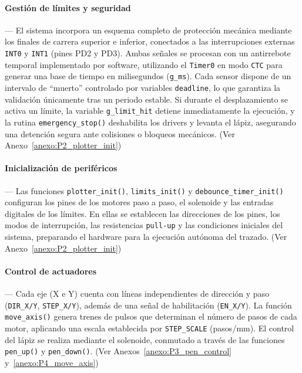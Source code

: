 \vspace{1em}

\paragraph*{\textbf{Gestión de límites y seguridad}}---
El sistema incorpora un esquema completo de protección mecánica mediante los finales de carrera superior e inferior, conectados a las interrupciones externas \texttt{INT0} y \texttt{INT1} (pines PD2 y PD3). Ambas señales se procesan con un antirrebote temporal implementado por software, utilizando el \texttt{Timer0} en modo \texttt{CTC} para generar una base de tiempo en milisegundos (\texttt{g\_ms}). Cada sensor dispone de un intervalo de “muerto” controlado por variables \texttt{deadline}, lo que garantiza la validación únicamente tras un periodo estable. Si durante el desplazamiento se activa un límite, la variable \texttt{g\_limit\_hit} detiene inmediatamente la ejecución, y la rutina \texttt{emergency\_stop()} deshabilita los drivers y levanta el lápiz, asegurando una detención segura ante colisiones o bloqueos mecánicos. (Ver Anexo~\ref{anexo:P2_plotter_init})

\vspace{1em}

\paragraph*{\textbf{Inicialización de periféricos}}---
Las funciones \texttt{plotter\_init()}, \texttt{limits\_init()} y \texttt{debounce\_timer\_init()} configuran los pines de los motores paso a paso, el solenoide y las entradas digitales de los límites. En ellas se establecen las direcciones de los pines, los modos de interrupción, las resistencias \texttt{pull-up} y las condiciones iniciales del sistema, preparando el hardware para la ejecución autónoma del trazado. (Ver Anexo~\ref{anexo:P2_plotter_init})

\vspace{1em}

\paragraph*{\textbf{Control de actuadores}}---
Cada eje (X e Y) cuenta con líneas independientes de dirección y paso (\texttt{DIR\_X/Y}, \texttt{STEP\_X/Y}), además de una señal de habilitación (\texttt{EN\_X/Y}). La función \texttt{move\_axis()} genera trenes de pulsos que determinan el número de pasos de cada motor, aplicando una escala establecida por \texttt{STEP\_SCALE} (pasos/mm). El control del lápiz se realiza mediante el solenoide, conmutado a través de las funciones \texttt{pen\_up()} y \texttt{pen\_down()}. (Ver Anexos~\ref{anexo:P3_pen_control} y~\ref{anexo:P4_move_axis})

